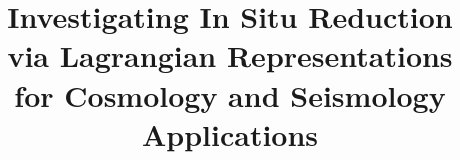 \documentclass[runningheads]{llncs}
\begin{document}
%
\title{Investigating In Situ Reduction \\via Lagrangian Representations\\ for Cosmology and Seismology Applications}
%
%
%
%
%
\author{}
\institute{}
\maketitle              %
%
\begin{abstract}

\end{abstract}
%
%
%


\end{document}
